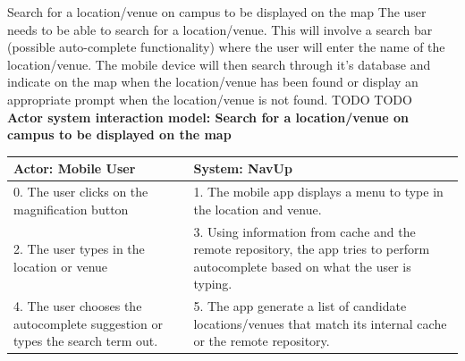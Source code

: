 \FuncReq
{Search for a location/venue on campus to be displayed on the map}
{The user needs to be able to search for a location/venue. This will involve a search bar (possible auto-complete functionality) where the user will enter the name of the location/venue. The mobile device will then search through it's database and indicate on the map when the location/venue has been found or display an appropriate prompt when the location/venue is not found.}
{TODO}
{TODO}
    \\
    \textbf{Actor system interaction model: Search for a location/venue on campus to be displayed on the map }\\
    \begin{tabular}{ | p{6cm} | p{6cm} |}
    \hline
    Actor: Mobile User & System: NavUp \\ \hline
    0. The user clicks on the magnification button & 1. The mobile app displays a menu to type in the location and venue.\\ \hline
    2. The user types in the location or venue & 3. Using information from cache and the remote repository, the app tries to perform autocomplete based on what the user is typing.\\ \hline
    4. The user chooses the autocomplete suggestion or types the search term out. & 5. The app generate a list of candidate locations/venues that match its internal cache or the remote repository.\\ \hline
    \end{tabular}
\\
\bigskip


